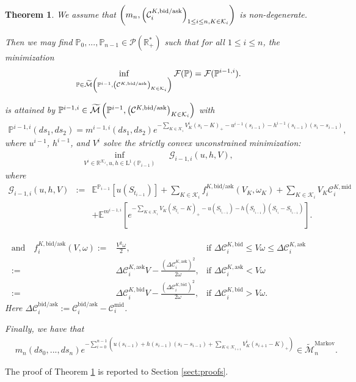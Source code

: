 \documentclass{amsart}%
\def \P{{\mathbb P}}
\def \R{\mathbb{R}}
\def\Cc{{\cal C}}
\def\Fc{{\cal F}}
\def\Gc{{\cal G}}
\def\Kc{{\cal K}}
\def\Pc{{\cal P}}
\def\no{\noindent}
\newtheorem{thm}{Theorem}[section]
\theoremstyle{definition}
\theoremstyle{remark}
\newcommand{\PP}{\mathbb{P}}
\newcommand{\bea}{\begin{eqnarray}}
\newcommand{\eea}{\end{eqnarray}}
\newcommand{\beaa}{\begin{eqnarray*}}
\newcommand{\eeaa}{\end{eqnarray*}}
\newcommand{\EE}{{\mathbb E}}
\newcommand{\RR}{{\mathbb R}}
\newcommand{\cal}{\mathcal}
\newcommand{\LL}{{\mathrm L}}
\begin{document}
\begin{thm}
\label{thm:minimG_elem_M_all}
We assume that $\left(m_n, \left(\Cc^{K,{\rm bid/ask}}_i\right)_{1\le i\le n,K\in\Kc_i}\right)$ is non-degenerate.

\no Then we may find $\P_0,...,\P_{n-1}\in \Pc(\R_+^*)$ such that for all $1\le i \le n$, the minimization
\beaa
\inf_{\PP \in \widetilde{\cal M}\left(\P^{i-1},\left(\Cc^{K,{\rm bid/ask}}\right)_{K\in\Kc_i}\right)} {\Fc}(\PP)={\Fc}(\PP^{i-1,i}).
\eeaa

is attained by $\PP^{i-1,i} \in \widetilde{\cal M}\left(\P^{i-1},\left(\Cc^{K,{\rm bid/ask}}\right)_{K\in\Kc_i}\right)$ with
\beaa
\PP^{i-1,i}(ds_1,ds_2)={m^{i-1,i}}(ds_1,ds_2) e^{- \sum_{K \in {\cal K}_i} V_K^i (s_{i}-K)_+-u^{i-1}(s_{i-1}) -h^{i-1}(s_{i-1})(s_i-s_{i-1})  },
\eeaa
where $u^{i-1}$, $h^{i-1}$, and $  V^{i}$ solve the strictly convex unconstrained minimization:
 \beaa
 \inf_{V^i \in \RR^{{\cal K}_i}, u, h \in \LL^1(\PP_{i-1})}&& \Gc_{i-1,i}(u,h,V),
 \eeaa
 where
\beaa
\Gc_{i-1,i}(u,h,V) &:=& \EE^{\PP_{i-1}}[u(S_{t_{i-1}})]+\sum_{K \in {\cal K}_i}f_i^{K,\mathrm{bid}/\mathrm{ask}}(V_K,\omega_K)+\sum_{K \in {\cal K}_i}  V_K \Cc^{K,\mathrm{mid}}_i \\
&&+\EE^{{m^{i-1,i}}}\left[  e^{- \sum_{K \in {\cal K}_i} V_K (S_{t_{i}}-K)_+ -u(S_{t_{i-1}})-h(S_{t_{i-1}})(S_{t_{i}}-S_{t_{i-1}})  }\right].
\eeaa

\beaa
\mbox{and}\quad f_i^{K,\mathrm{bid}/\mathrm{ask}}(V,\omega):=&\frac{V^2 \omega }{2}, &\mbox{if }  \Delta \Cc_i^{K,\mathrm{bid}}\leq V \omega \leq  \Delta \Cc_i^{K,\mathrm{ask}} \\
 :=&\Delta \Cc_i^{K,\mathrm{ask}} V -\frac{(\Delta \Cc_i^{K,\mathrm{ask}})^2 }{2 \omega}
 , &\mbox{if }  \Delta \Cc_i^{K,\mathrm{ask}}< V \omega \\
 :=& \Delta \Cc_i^{K,\mathrm{bid}} V -\frac{(\Delta \Cc_i^{K,\mathrm{bid}})^2 }{2 \omega}
 , &\mbox{if }   \Delta \Cc_i^{K,\mathrm{bid}}> V \omega.
\eeaa
Here $ \Delta {\cal C}_i^{\mathrm{bid}/\mathrm{ask}}:= {\cal C}_i^{\mathrm{bid}/\mathrm{ask}}-{\cal C}_i^\mathrm{mid}$. 

Finally, we have that
\bea\label{eq:found_m_markov} 
&m_n(ds_0,...,ds_{n}) e^{- \sum_{i=0}^{n-1}\left(u(s_{i-1})+h(s_{i-1})(s_{i}-s_{i-1})+\sum_{K \in {\cal K}_{i+1}} V_K^i (s_{i+1}-K)_+ \right)  }\in \widetilde{\cal M}^\mathrm{Markov}_n.
\eea 
\end{thm}

\no The proof of Theorem \ref{thm:minimG_elem_M_all} is reported to Section \ref{sect:proofs}.
\end{document}
